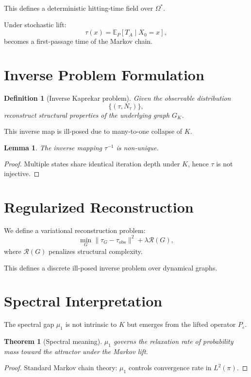 \documentclass[11pt]{article}
\newtheorem{definition}{Definition}
\newtheorem{theorem}{Theorem}
\newtheorem{lemma}{Lemma}
\begin{document}
This defines a deterministic hitting-time field over $\Omega^*$.

Under stochastic lift:
\[
\tau(x) = \mathbb{E}_P[T_A \mid X_0 = x],
\]
becomes a first-passage time of the Markov chain.

\section{Inverse Problem Formulation}

\begin{definition}[Inverse Kaprekar problem]
Given the observable distribution
\[
\{(\tau, N_\tau)\},
\]
reconstruct structural properties of the underlying graph $G_K$.
\end{definition}

This inverse map is ill-posed due to many-to-one collapse of $K$.

\begin{lemma}
The inverse mapping $\tau^{-1}$ is non-unique.
\end{lemma}

\begin{proof}
Multiple states share identical iteration depth under $K$, hence $\tau$ is not injective.
\end{proof}

\section{Regularized Reconstruction}

We define a variational reconstruction problem:
\[
\min_G \| \tau_G - \tau_{\mathrm{obs}} \|^2 + \lambda \mathcal{R}(G),
\]
where $\mathcal{R}(G)$ penalizes structural complexity.

This defines a discrete ill-posed inverse problem over dynamical graphs.

\section{Spectral Interpretation}

The spectral gap $\mu_1$ is not intrinsic to $K$ but emerges from the lifted operator $P_\varepsilon$.

\begin{theorem}[Spectral meaning]
$\mu_1$ governs the relaxation rate of probability mass toward the attractor under the Markov lift.
\end{theorem}

\begin{proof}
Standard Markov chain theory: $\mu_1$ controls convergence rate in $L^2(\pi)$.
\end{proof}
\end{document}
